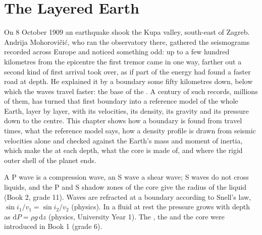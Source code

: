 \chapter{The Layered Earth}\label{ch:b1:layered-earth}

On 8 October 1909 an earthquake shook the Kupa valley, south-east of Zagreb.
Andrija Mohorovičić, who ran the observatory there, gathered the seismograms
recorded across Europe and noticed something odd: up to a few hundred
kilometres from the epicentre the first tremor came in one way, farther out a
second kind of first arrival took over, as if part of the energy had found a
faster road at depth. He explained it by a boundary some fifty kilometres down,
below which the waves travel faster: the base of the . A century of such
records, millions of them, has turned that first boundary into a reference
model of the whole Earth, layer by layer, with its velocities, its density, its
gravity and its pressure down to the centre. This chapter shows how a
boundary is found from travel times, what the reference model says, how a
density profile is drawn from seismic velocities alone and checked against the
Earth's mass and moment of inertia, which  make the  at each
depth, what the core is made of, and where the rigid outer shell of the planet
ends.

\begin{recall}
A P wave is a compression wave, an S wave a shear wave; S waves do not cross
liquids, and the P and S shadow zones of the core give the radius of the liquid
 (Book 2, grade 11). Waves are refracted at a boundary according to
Snell's law, $\sin i_1/v_1 = \sin i_2/v_2$ (physics). In a fluid at rest the
pressure grows with depth as $\mathrm dP = \rho g\,\mathrm dz$ (physics,
University Year 1). The , the  and the core were introduced in
Book 1 (grade 6).
\end{recall}

